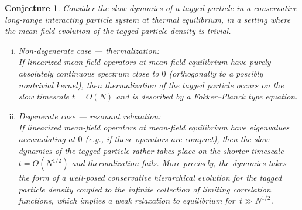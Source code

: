 \documentclass[a4paper,11pt,reqno,noindent]{amsart}
\theoremstyle{plain}
\newtheorem{conj1}{Conjecture}
\numberwithin{equation}{section}
\newcommand{\3}{|\!|\!|}
\begin{document}
\begin{samepage}\begin{conj1}\label{conj}
Consider the slow dynamics of a tagged particle in a conservative long-range interacting particle system at thermal equilibrium, {in a setting where the mean-field evolution of the tagged particle density is trivial.}
\begin{enumerate}[(i)]
\item \emph{Non-degenerate case {--- thermalization}:}\\
If linearized mean-field operators at mean-field equilibrium have purely absolutely continuous spectrum close to $0$ (orthogonally to a possibly nontrivial kernel), then thermalization of the tagged particle occurs on the slow timescale $t=O(N)$ and is described by a Fokker--Planck type equation.
\smallskip\item \emph{Degenerate case {--- resonant relaxation}:}\\
If linearized mean-field operators at mean-field equilibrium have eigenvalues accumulating at $0$ (e.g., if these operators are compact), then the slow dynamics of the tagged particle rather takes place on the shorter timescale $t=O(N^{1/2})$ and thermalization fails. More precisely, the dynamics takes the form of a well-posed {conservative} hierarchical evolution for the tagged particle density coupled to the infinite collection of limiting correlation functions, {which implies a weak relaxation to equilibrium for~$t\gg N^{1/2}$.}
\end{enumerate}
\end{conj1}\end{samepage}
\end{document}
